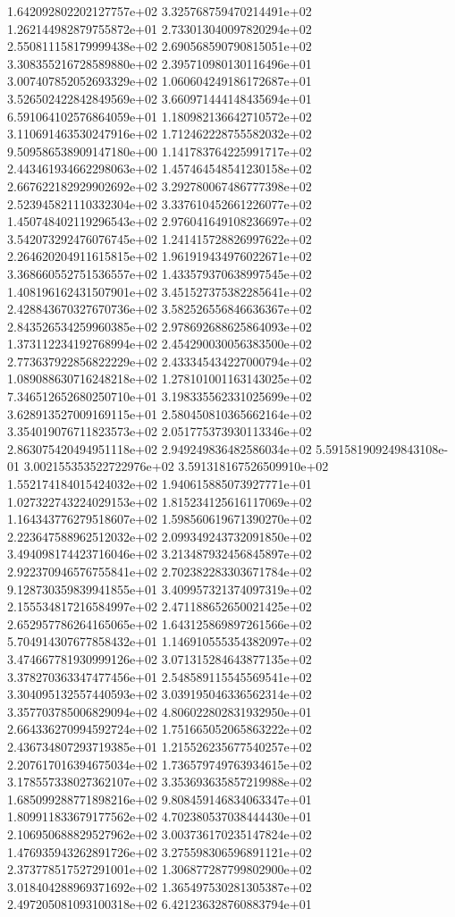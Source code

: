 1.642092802202127757e+02 3.325768759470214491e+02 1.262144982879755872e+01
2.733013040097820294e+02 2.550811158179999438e+02 2.690568590790815051e+02
3.308355216728589880e+02 2.395710980130116496e+01 3.007407852052693329e+02
1.060604249186172687e+01 3.526502422842849569e+02 3.660971444148435694e+01
6.591064102576864059e+01 1.180982136642710572e+02 3.110691463530247916e+02
1.712462228755582032e+02 9.509586538909147180e+00 1.141783764225991717e+02
2.443461934662298063e+02 1.457464548541230158e+02 2.667622182929902692e+02
3.292780067486777398e+02 2.523945821110332304e+02 3.337610452661226077e+02
1.450748402119296543e+02 2.976041649108236697e+02 3.542073292476076745e+02
1.241415728826997622e+02 2.264620204911615815e+02 1.961919434976022671e+02
3.368660552751536557e+02 1.433579370638997545e+02 1.408196162431507901e+02
3.451527375382285641e+02 2.428843670327670736e+02 3.582526556846636367e+02
2.843526534259960385e+02 2.978692688625864093e+02 1.373112234192768994e+02
2.454290030056383500e+02 2.773637922856822229e+02 2.433345434227000794e+02
1.089088630716248218e+02 1.278101001163143025e+02 7.346512652680250710e+01
3.198335562331025699e+02 3.628913527009169115e+01 2.580450810365662164e+02
3.354019076711823573e+02 2.051775373930113346e+02 2.863075420494951118e+02
2.949249836482586034e+02 5.591581909249843108e-01 3.002155353522722976e+02
3.591318167526509910e+02 1.552174184015424032e+02 1.940615885073927771e+01
1.027322743224029153e+02 1.815234125616117069e+02 1.164343776279518607e+02
1.598560619671390270e+02 2.223647588962512032e+02 2.099349243732091850e+02
3.494098174423716046e+02 3.213487932456845897e+02 2.922370946576755841e+02
2.702382283303671784e+02 9.128730359839941855e+01 3.409957321374097319e+02
2.155534817216584997e+02 2.471188652650021425e+02 2.652957786264165065e+02
1.643125869897261566e+02 5.704914307677858432e+01 1.146910555354382097e+02
3.474667781930999126e+02 3.071315284643877135e+02 3.378270363347477456e+01
2.548589115545569541e+02 3.304095132557440593e+02 3.039195046336562314e+02
3.357703785006829094e+02 4.806022802831932950e+01 2.664336270994592724e+02
1.751665052065863222e+02 2.436734807293719385e+01 1.215526235677540257e+02
2.207617016394675034e+02 1.736579749763934615e+02 3.178557338027362107e+02
3.353693635857219988e+02 1.685099288771898216e+02 9.808459146834063347e+01
1.809911833679177562e+02 4.702380537038444430e+01 2.106950688829527962e+02
3.003736170235147824e+02 1.476935943262891726e+02 3.275598306596891121e+02
2.373778517527291001e+02 1.306877287799802900e+02 3.018404288969371692e+02
1.365497530281305387e+02 2.497205081093100318e+02 6.421236328760883794e+01
